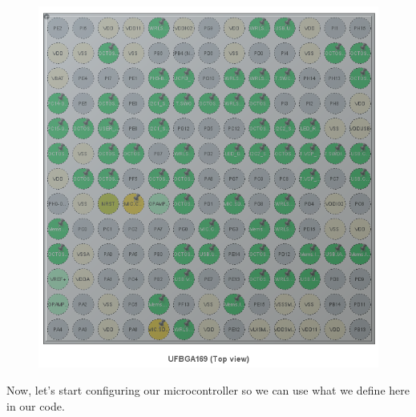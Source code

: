 \documentclass[10pt,a4paper,onecolumn]{article}
\begin{document}
\begin{figure}[H]
  \begin{center}
    \includegraphics[width=\dimexpr\textwidth-1cm\relax,height=\dimexpr0.25\textheight-1cm\relax,keepaspectratio]{images/43.png}
  \end{center}
\end{figure}

Now, let's start configuring our microcontroller so we can use what we
define here in our code.
\end{document}
